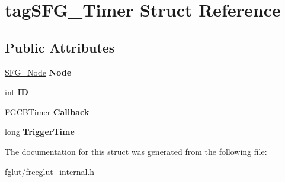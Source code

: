\hypertarget{structtag_s_f_g___timer}{}\section{tag\+S\+F\+G\+\_\+\+Timer Struct Reference}
\label{structtag_s_f_g___timer}
\subsection*{Public Attributes}
\begin{DoxyCompactItemize}
\item 
\hyperlink{structtag_s_f_g___node}{S\+F\+G\+\_\+\+Node} {\bfseries Node}\hypertarget{structtag_s_f_g___timer_a6e7e5a2bf21a1f0f539991047eac9f9c}{}\label{structtag_s_f_g___timer_a6e7e5a2bf21a1f0f539991047eac9f9c}

\item 
int {\bfseries ID}\hypertarget{structtag_s_f_g___timer_af8c0dbe9372e0a780ddbc145de06081a}{}\label{structtag_s_f_g___timer_af8c0dbe9372e0a780ddbc145de06081a}

\item 
F\+G\+C\+B\+Timer {\bfseries Callback}\hypertarget{structtag_s_f_g___timer_a31af9e92ea395bf269828a639680f201}{}\label{structtag_s_f_g___timer_a31af9e92ea395bf269828a639680f201}

\item 
long {\bfseries Trigger\+Time}\hypertarget{structtag_s_f_g___timer_a1cde95add84adbbd5803d6238945407b}{}\label{structtag_s_f_g___timer_a1cde95add84adbbd5803d6238945407b}

\end{DoxyCompactItemize}


The documentation for this struct was generated from the following file\+:\begin{DoxyCompactItemize}
\item 
fglut/freeglut\+\_\+internal.\+h\end{DoxyCompactItemize}
